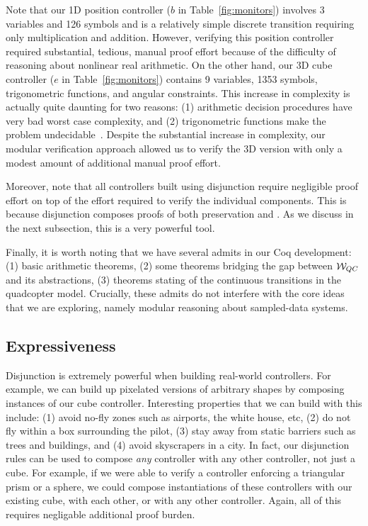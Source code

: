 Note that our 1D position controller ($b$ in Table~\ref{fig:monitors})
involves 3 variables and 126 symbols and is a relatively simple discrete
transition requiring only multiplication and addition.  However, verifying
this position controller required substantial, tedious, manual proof effort
because of the difficulty of reasoning about nonlinear real arithmetic.  On
the other hand, our 3D cube controller ($e$ in Table~\ref{fig:monitors})
contains 9 variables, 1353 symbols, trigonometric functions, and angular
constraints.  This increase in complexity is actually quite daunting for
two reasons: (1) arithmetic decision procedures have very bad worst case
complexity, and (2) trigonometric functions make the problem
undecidable~\cite{HarrisonLogic09}.  Despite the substantial increase in
complexity, our modular verification approach allowed us to verify the 3D
version with only a modest amount of additional manual proof effort.

Moreover, note that all controllers built using disjunction require
negligible proof effort on top of the effort required to verify the
individual components.  This is because disjunction composes proofs of both
preservation and \progress{}. As we discuss in the next subsection, this is
a very powerful tool.

Finally, it is worth noting that we have several admits in our Coq
development: (1) basic arithmetic theorems, (2) some theorems bridging the
gap between $\mathcal{W}_{QC}$ and its abstractions, (3) theorems
stating \progress{} of the continuous transitions in the quadcopter model.
Crucially, these admits do not interfere with the core ideas that we are
exploring, namely modular reasoning about sampled-data systems.

\subsection{Expressiveness}
Disjunction is extremely powerful when building real-world controllers.
For example, we can build up pixelated versions of arbitrary shapes by
composing instances of our cube controller.  Interesting properties that we
can build with this include: (1) avoid no-fly zones such as airports, the
white house, etc, (2) do not fly within a box surrounding the pilot, (3)
stay away from static barriers such as trees and buildings, and (4) avoid
skyscrapers in a city. In fact, our disjunction rules can be used to
compose \emph{any} controller with any other controller, not just a cube.
For example, if we were able to verify a controller enforcing a triangular
prism or a sphere, we could compose instantiations of these controllers
with our existing cube, with each other, or with any other controller.
Again, all of this requires negligable additional proof burden.

